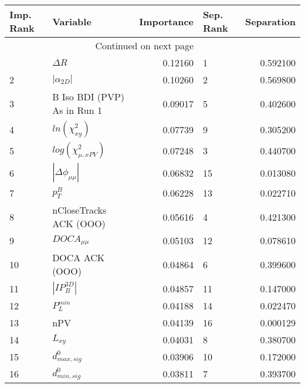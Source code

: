 \usepackage{lscape}

\begin{landscape}
\begin{longtable}{llrlr}
\toprule
Imp. Rank &                     Variable &  Importance & Sep. Rank &  Separation \\
\midrule
\endhead
\midrule
\multicolumn{3}{r}{{Continued on next page}} \\
\midrule
\endfoot

\bottomrule
\endlastfoot
        1 &                   $\Delta R$ &     0.12160 &         1 &    0.592100 \\
        2 &              $|\alpha_{2D}|$ &     0.10260 &         2 &    0.569800 \\
        3 &  B Iso BDI (PVP) As in Run 1 &     0.09017 &         5 &    0.402600 \\
        4 &          $ln(\chi^{2}_{xy})$ &     0.07739 &         9 &    0.305200 \\
        5 &    $log(\chi^{2}_{\mu,xPV})$ &     0.07248 &         3 &    0.440700 \\
        6 &     $|\Delta \phi_{\mu\mu}|$ &     0.06832 &        15 &    0.013080 \\
        7 &                    $p^B_{T}$ &     0.06228 &        13 &    0.022710 \\
        8 &       nCloseTracks ACK (OOO) &     0.05616 &         4 &    0.421300 \\
        9 &              $DOCA_{\mu\mu}$ &     0.05103 &        12 &    0.078610 \\
       10 &               DOCA ACK (OOO) &     0.04864 &         6 &    0.399600 \\
       11 &              $|IP_{B}^{3D}|$ &     0.04857 &        11 &    0.147000 \\
       12 &                $P^{min}_{L}$ &     0.04188 &        14 &    0.022470 \\
       13 &                          nPV &     0.04139 &        16 &    0.000129 \\
       14 &                     $L_{xy}$ &     0.04031 &         8 &    0.380700 \\
       15 &             $d^0_{max, sig}$ &     0.03906 &        10 &    0.172000 \\
       16 &             $d^0_{min, sig}$ &     0.03811 &         7 &    0.393700 \\
\end{longtable}

\end{landscape}
